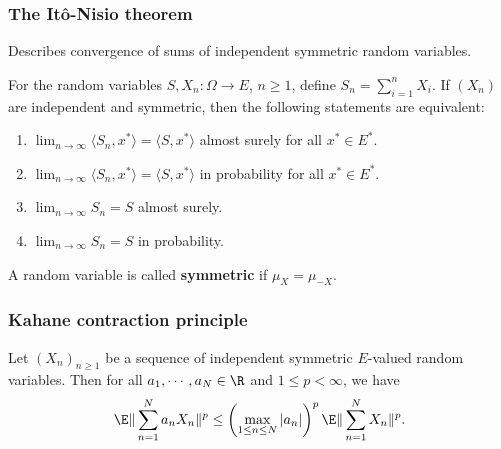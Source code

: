 \begin{frame}
    \frametitle{The It\^o-Nisio theorem}
    
    Describes convergence of sums of independent symmetric random variables.
    \begin{theorem}
        For the random variables $S,X_n : \Omega\to E$, $n\geq 1$, define 
        $S_n = \sum_{i=1}^{n} X_i$. If $(X_n)$ are independent and symmetric,
        then the following statements are equivalent:
        \begin{enumerate}
            \item $\lim_{n\to\infty} \langle S_n, x^{*} \rangle = \langle S, x^{*} \rangle$ 
                almost surely for all $x^* \in E^*$.
            \item $\lim_{n\to\infty} \langle S_n, x^{*} \rangle = \langle S, x^{*} \rangle$ 
                in probability for all $x^* \in E^*$.
            \item $\lim_{n\to\infty} S_n = S$ almost surely.
            \item $\lim_{n\to\infty} S_n = S$ in probability.
        \end{enumerate}
    \end{theorem}

    A random variable is called \textbf{symmetric} if $\mu_{X}=\mu_{-X}$.

\end{frame}



\begin{frame}
    \frametitle{Kahane contraction principle}
    
    Let $(X_n)_{n\geq 1}$ be a sequence of independent symmetric $E$-valued
    random variables. Then for all $a_1, \cdots , a_N \in \R$ and $1\leq p < \infty$,
    we have
    \begin{equation*}
        \E \| \sum_{n=1}^{N} a_n X_n \|^p  \leq 
        \left( \max_{1\leq n \leq N} |a_n| \right)^p 
        \E \| \sum_{n=1}^{N} X_n \|^p.
    \end{equation*}
\end{frame}


